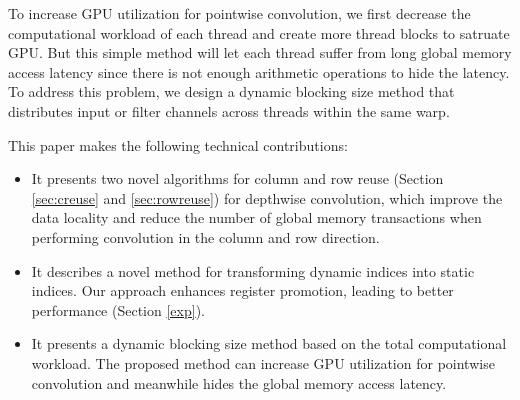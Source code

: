 To increase GPU utilization for pointwise convolution, we first decrease the computational workload of each thread and create more thread blocks to satruate GPU. 
But this simple method will let each thread suffer from long global memory access latency since there is not enough arithmetic operations to hide the latency.
To address this problem, we design a dynamic blocking size method that distributes input or filter channels across threads within the same warp. 

This paper makes the following technical contributions:
\begin{itemize}
    \item It presents two novel algorithms for column and row reuse (Section \ref{sec:creuse} and \ref{sec:rowreuse}) for depthwise convolution, which improve the data locality and reduce the number of global memory transactions when performing convolution in the column and row direction.
    \item It describes a novel method for transforming dynamic indices into static indices. 
    Our approach enhances register promotion, leading to better performance (Section \ref{exp}).
    \item It presents a dynamic blocking size method based on the total computational workload. The proposed method can increase GPU utilization for pointwise convolution and meanwhile hides the global memory access latency. 
\end{itemize}
